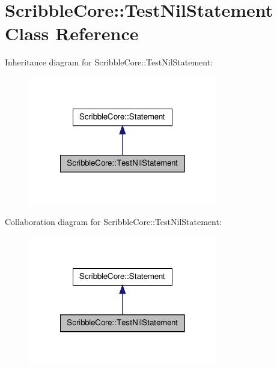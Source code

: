 \hypertarget{class_scribble_core_1_1_test_nil_statement}{\section{Scribble\-Core\-:\-:Test\-Nil\-Statement Class Reference}
\label{class_scribble_core_1_1_test_nil_statement}
}


Inheritance diagram for Scribble\-Core\-:\-:Test\-Nil\-Statement\-:
\nopagebreak
\begin{figure}[H]
\begin{center}
\leavevmode
\includegraphics[width=234pt]{class_scribble_core_1_1_test_nil_statement__inherit__graph}
\end{center}
\end{figure}


Collaboration diagram for Scribble\-Core\-:\-:Test\-Nil\-Statement\-:
\nopagebreak
\begin{figure}[H]
\begin{center}
\leavevmode
\includegraphics[width=234pt]{class_scribble_core_1_1_test_nil_statement__coll__graph}
\end{center}
\end{figure}
